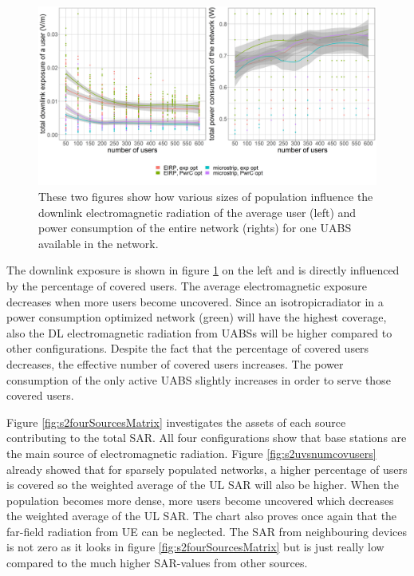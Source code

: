 \begin{figure}[h!]
  \includegraphics[width=\textwidth]{../results/s2/uvsdlAndPc.png}
  \caption{These two figures show how various sizes of population influence the downlink electromagnetic radiation of the average user (left) and 
  power consumption of the entire network (rights) for one \gls{UABS} available in the network.}
  \label{fig:s2b_dlAndPc}
\end{figure}

The downlink exposure is shown in figure \ref{fig:s2b_dlAndPc} on the left and is directly influenced by the percentage of covered users. 
The average electromagnetic exposure decreases when more users become uncovered. Since an \gls{isotropicradiator} in a power consumption optimized network (green)
will have the highest coverage, also the \gls{DL} electromagnetic radiation from \gls{UABS}s will be higher compared to other configurations.
Despite the fact that the percentage of covered users decreases, the effective number of covered users increases. The power consumption of the only 
active \gls{UABS} slightly increases in order to serve those covered users.


Figure \ref{fig:s2fourSourcesMatrix} investigates the assets of each source contributing to the total \gls{SAR}. All four 
configurations show that base stations are the main source of electromagnetic radiation.
Figure \ref{fig:s2uvsnumcovusers} already 
showed that for sparsely populated networks, a higher percentage of users is covered so the weighted average of the \gls{UL} \gls{SAR} will also be higher. 
When the population becomes more dense,
more users become uncovered which decreases the weighted average of the \gls{UL} \gls{SAR}.
The chart also proves once again that the far-field radiation from \gls{UE} can be neglected. The \gls{SAR} from 
neighbouring devices is not zero as it looks in figure \ref{fig:s2fourSourcesMatrix} but is just really low compared to the much higher
\gls{SAR}-values from other sources.

